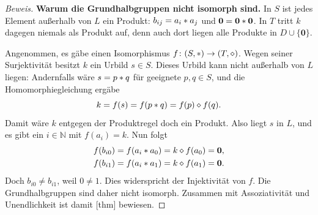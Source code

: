 \begin{proof}[Beweis]
\medskip\noindent
\textbf{Warum die Grundhalbgruppen nicht isomorph sind.}
In \(S\) ist jedes Element außerhalb von \(L\) ein Produkt:
\(b_{ij}=a_i\mathbin{\ast} a_j\) und
\(\mathbf0=\mathbf0\mathbin{\ast}\mathbf0\).
In \(T\) tritt \(k\) dagegen niemals als Produkt auf, denn auch dort
liegen alle Produkte in \(D\cup\{\mathbf0\}\).

Angenommen, es gäbe einen Isomorphismus
\(f\colon(S,\mathbin{\ast})\to(T,\mathbin{\diamond})\).
Wegen seiner Surjektivität besitzt \(k\) ein Urbild \(s\in S\).
Dieses Urbild kann nicht außerhalb von \(L\) liegen: Andernfalls wäre
\(s=p\mathbin{\ast} q\) für geeignete \(p,q\in S\), und die
Homomorphiegleichung ergäbe
\[
  k=f(s)=f(p\mathbin{\ast} q)=f(p)\mathbin{\diamond} f(q).
\]
Damit wäre \(k\) entgegen der Produktregel doch ein Produkt.
Also liegt \(s\) in \(L\), und es gibt ein \(i\in\mathbb N\)
mit \(f(a_i)=k\). Nun folgt
\[
  \begin{aligned}
    f(b_{i0})
      &=f(a_i\mathbin{\ast} a_0)
        =k\mathbin{\diamond} f(a_0)=\mathbf0,\\
    f(b_{i1})
      &=f(a_i\mathbin{\ast} a_1)
        =k\mathbin{\diamond} f(a_1)=\mathbf0.
  \end{aligned}
\]
Doch \(b_{i0}\neq b_{i1}\), weil \(0\neq1\). Dies widerspricht
der Injektivität von \(f\). Die Grundhalbgruppen sind daher nicht
isomorph. Zusammen mit Assoziativität und Unendlichkeit ist damit
[thm] bewiesen.


\end{proof}
